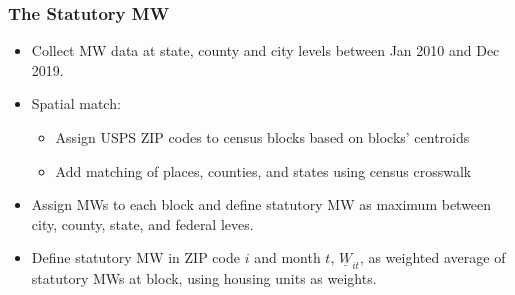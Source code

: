 \documentclass[aspectratio=169, t]{beamer}
\newcommand{\MW}{\underline{W}}
\begin{document}
\begin{frame}[label=stat_MW]
    \frametitle{The Statutory MW}
    
    \begin{itemize}
        \item
        Collect MW data at state, county and city levels between Jan 2010 and Dec 2019.
        
        \vspace{2mm}
        \item
        Spatial match:
        \begin{itemize}
            \item Assign USPS ZIP codes to census blocks based on blocks' centroids
            \item Add matching of places, counties, and states using census crosswalk
        \end{itemize}
        
        \vspace{2mm}
        \item
        Assign MWs to each block and define statutory MW as maximum between city, 
        county, state, and federal leves.
        
        \vspace{2mm}
        \item
        Define statutory MW in ZIP code $i$ and month $t$, $\MW_{it}$, as weighted
        average of statutory MWs at block, using housing units as weights.

    \end{itemize}
    
\end{frame}
\end{document}
